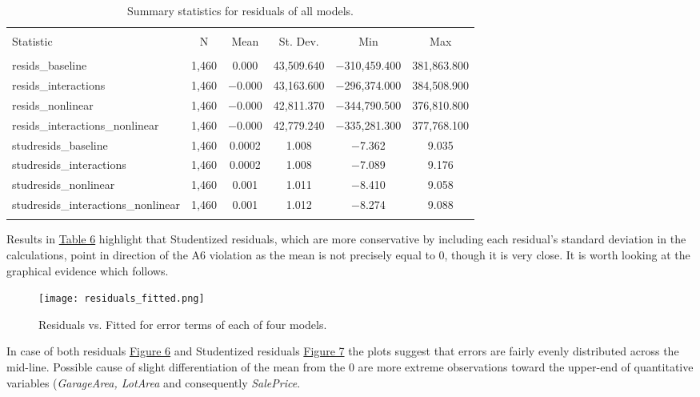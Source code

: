 \documentclass{article}
\begin{document}
\begin{table}[!htbp]
\centering
\caption{\label{tab:residuals} Summary statistics for residuals of all models.}
\begin{tabular}{@{\extracolsep{5pt}}lccccc} 
\\[-1.8ex]\hline 
\hline \\[-1.8ex] 
Statistic & \multicolumn{1}{c}{N} & \multicolumn{1}{c}{Mean} & \multicolumn{1}{c}{St. Dev.} & \multicolumn{1}{c}{Min} & \multicolumn{1}{c}{Max} \\ 
\hline \\[-1.8ex] 
resids\_baseline & 1,460 & 0.000 & 43,509.640 & $-$310,459.400 & 381,863.800 \\ 
resids\_interactions & 1,460 & $-$0.000 & 43,163.600 & $-$296,374.000 & 384,508.900 \\ 
resids\_nonlinear & 1,460 & $-$0.000 & 42,811.370 & $-$344,790.500 & 376,810.800 \\ 
resids\_interactions\_nonlinear & 1,460 & $-$0.000 & 42,779.240 & $-$335,281.300 & 377,768.100 \\ 
studresids\_baseline & 1,460 & 0.0002 & 1.008 & $-$7.362 & 9.035 \\ 
studresids\_interactions & 1,460 & 0.0002 & 1.008 & $-$7.089 & 9.176 \\ 
studresids\_nonlinear & 1,460 & 0.001 & 1.011 & $-$8.410 & 9.058 \\ 
studresids\_interactions\_nonlinear & 1,460 & 0.001 & 1.012 & $-$8.274 & 9.088 \\ 
\hline \\[-1.8ex] 
\end{tabular} 
\end{table}

Results in \hyperref[tab:residuals]{Table 6} highlight that Studentized residuals, which are more conservative by including each residual's standard deviation in the calculations, point in direction of the A6 violation as the mean is not precisely equal to 0, though it is very close. It is worth looking at the graphical evidence which follows.

\begin{figure}[htp]
    \caption{Residuals vs. Fitted for error terms of each of four models.}
    \centering
    \texttt{[image: residuals\_fitted.png]}
    \label{fig:residualsfitted}
\end{figure}

In case of both residuals \hyperref[fig:residualsfitted]{Figure 6} and Studentized residuals \hyperref[fig:sturesidualsfitted]{Figure 7} the plots suggest that errors are fairly evenly distributed across the mid-line. Possible cause of slight differentiation of the mean from the 0 are more extreme observations toward the upper-end of quantitative variables (\emph{GarageArea, LotArea} and consequently \emph{SalePrice}.
\end{document}
